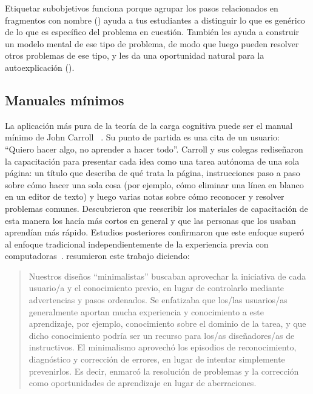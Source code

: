 Etiquetar sub\-objetivos funciona porque agrupar los pasos relacionados en fragmentos con nombre ()
ayuda a tus estudiantes a distinguir lo que es genérico de lo que es específico del problema en cuestión.
También les ayuda a construir un modelo mental de ese tipo de problema,
de modo que luego pueden resolver otros problemas de ese tipo,
y les da una oportunidad natural para la auto\-explicación ().

\subsection*{Manuales mínimos}

La aplicación más pura de la teoría de la carga cognitiva puede ser el manual mínimo de
John Carroll ~\cite{Carr1987,Carr2014}.
Su punto de partida es una cita de un usuario: ``Quiero hacer algo, no aprender a hacer todo''.
Carroll y sus colegas rediseñaron la capacitación para presentar cada idea como una tarea autónoma de una sola página:
un título que describa de qué trata la página,
instrucciones paso a paso sobre cómo hacer una sola cosa
(por ejemplo, cómo eliminar una línea en blanco en un editor de texto)
y luego varias notas sobre cómo reconocer y resolver problemas comunes.
Descubrieron que reescribir los materiales de capacitación de esta manera los hacía más cortos en general
y que las personas que los usaban aprendían más rápido.
Estudios posteriores confirmaron que este enfoque superó al enfoque tradicional
independientemente de la experiencia previa con computadoras~\cite{Lazo1993}.
\cite{Carr2014} resumieron este trabajo diciendo:

\begin{quote}

  Nuestros diseños ``minimalistas'' buscaban aprovechar la iniciativa de cada usuario/a y el conocimiento previo,
  en lugar de controlarlo mediante advertencias y pasos ordenados.
  Se enfatizaba que los/las usuarios/as generalmente aportan mucha experiencia y conocimiento a este aprendizaje,
  por ejemplo,
  conocimiento sobre el dominio de la tarea,
  y que dicho conocimiento podría ser un recurso para los/as diseñadores/as de instructivos.
  El minimalismo aprovechó los episodios de reconocimiento, diagnóstico y corrección de errores,
  en lugar de intentar simplemente prevenirlos. Es decir,
  enmarcó la resolución de problemas y la corrección como oportunidades de aprendizaje en lugar de aberraciones.

\end{quote}


